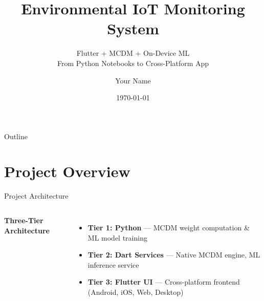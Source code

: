 \documentclass[aspectratio=169]{beamer}
\title[Environmental IoT Monitoring System]
      {\textbf{Environmental IoT Monitoring System}}
\subtitle{Flutter + MCDM + On-Device ML \\ From Python Notebooks to Cross-Platform App}
\author[Your Name]{Your Name}
\institute[University]{Smart Study Desk Monitor Project}
\date{\today}
\begin{document}
\begin{frame}
  \titlepage
\end{frame}

\begin{frame}{Outline}
  \tableofcontents
\end{frame}

\section{Project Overview}
\begin{frame}[allowframebreaks]{Project Architecture}
  \begin{columns}
    \textbf{Three-Tier Architecture}
    \begin{itemize}
      \item \alert{\textbf{Tier 1: Python}} --- MCDM weight computation \& ML model training
      \item \alert{\textbf{Tier 2: Dart Services}} --- Native MCDM engine, ML inference service
      \item \alert{\textbf{Tier 3: Flutter UI}} --- Cross-platform frontend (Android, iOS, Web, Desktop)
    \end{itemize}


\end{columns}
\end{frame}
\end{document}
